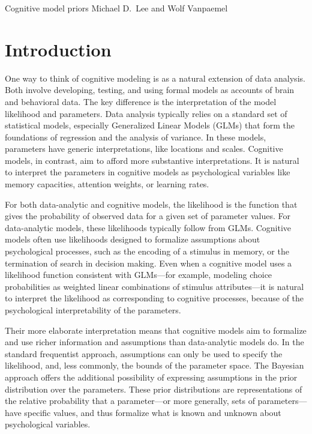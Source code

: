 {Cognitive model priors}
{Michael D.\ Lee and Wolf Vanpaemel}

\newcommand{\GG}[1]{} %

\section{Introduction}

One way to think of cognitive modeling is as a natural extension of data analysis. Both involve developing, testing, and using formal models as accounts of brain and behavioral data. The key difference is the interpretation of the model likelihood and parameters. Data analysis typically relies on a standard set of statistical models, especially Generalized Linear Models (GLMs) that form the foundations of regression and the analysis of variance. In these models, parameters have generic interpretations, like locations and scales. Cognitive models, in contrast, aim to afford more substantive interpretations. It is natural to interpret the parameters in cognitive models as psychological variables like memory capacities, attention weights, or learning rates.

For both data-analytic and cognitive models, the likelihood is the function that gives the probability of observed data for a given set of parameter values. For data-analytic models, these likelihoods typically follow from GLMs. Cognitive models often use likelihoods designed to formalize assumptions about psychological processes, such as the encoding of a stimulus in memory, or the termination of search in decision making. Even when a cognitive model uses a likelihood function consistent with GLMs---for example, modeling choice probabilities as weighted linear combinations of stimulus attributes---it is natural to interpret the likelihood as corresponding to cognitive processes, because of the psychological interpretability of the parameters.

Their more elaborate interpretation means that cognitive models aim to formalize and use richer information and assumptions than data-analytic models do. In the standard frequentist approach, assumptions can only be used to specify the likelihood, and, less commonly, the bounds of the parameter space. The Bayesian approach offers the additional possibility of expressing assumptions in the prior distribution over the parameters. These prior distributions are representations of the relative probability that a parameter---or more generally, sets of parameters---have specific values, and thus formalize what is known and unknown about psychological variables.

